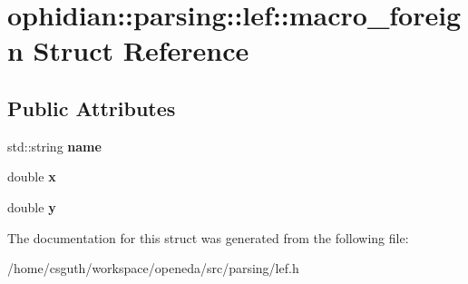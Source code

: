 \hypertarget{structophidian_1_1parsing_1_1lef_1_1macro__foreign}{\section{ophidian\-:\-:parsing\-:\-:lef\-:\-:macro\-\_\-foreign Struct Reference}
\label{structophidian_1_1parsing_1_1lef_1_1macro__foreign}
}
\subsection*{Public Attributes}
\begin{DoxyCompactItemize}
\item 
\hypertarget{structophidian_1_1parsing_1_1lef_1_1macro__foreign_a5253fe0760993bf4d0d033304a2876c5}{std\-::string {\bfseries name}}\label{structophidian_1_1parsing_1_1lef_1_1macro__foreign_a5253fe0760993bf4d0d033304a2876c5}

\item 
\hypertarget{structophidian_1_1parsing_1_1lef_1_1macro__foreign_ad5f0c5a0a8ea7535172bb29cce60d8eb}{double {\bfseries x}}\label{structophidian_1_1parsing_1_1lef_1_1macro__foreign_ad5f0c5a0a8ea7535172bb29cce60d8eb}

\item 
\hypertarget{structophidian_1_1parsing_1_1lef_1_1macro__foreign_a0ee2c4e80d31d7999f07ef3436fa8d78}{double {\bfseries y}}\label{structophidian_1_1parsing_1_1lef_1_1macro__foreign_a0ee2c4e80d31d7999f07ef3436fa8d78}

\end{DoxyCompactItemize}


The documentation for this struct was generated from the following file\-:\begin{DoxyCompactItemize}
\item 
/home/csguth/workspace/openeda/src/parsing/lef.\-h\end{DoxyCompactItemize}
